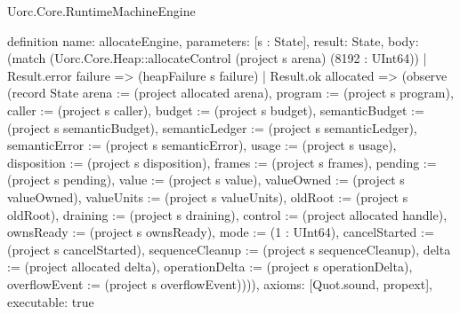 \begin{lexlean}{Uorc.Core.RuntimeMachineEngine}
\begin{semanticmodule}
definition{
  name: allocateEngine,
  parameters: [s : State],
  result: State,
  body: (match (Uorc.Core.Heap::allocateControl (project s arena) (8192 : UInt64))
    | Result.error failure => (heapFailure s failure)
    | Result.ok allocated => (observe (record State {arena := (project allocated arena), program := (project s program), caller := (project s caller), budget := (project s budget), semanticBudget := (project s semanticBudget), semanticLedger := (project s semanticLedger), semanticError := (project s semanticError), usage := (project s usage), disposition := (project s disposition), frames := (project s frames), pending := (project s pending), value := (project s value), valueOwned := (project s valueOwned), valueUnits := (project s valueUnits), oldRoot := (project s oldRoot), draining := (project s draining), control := (project allocated handle), ownsReady := (project s ownsReady), mode := (1 : UInt64), cancelStarted := (project s cancelStarted), sequenceCleanup := (project s sequenceCleanup), delta := (project allocated delta), operationDelta := (project s operationDelta), overflowEvent := (project s overflowEvent)}))),
  axioms: [Quot.sound, propext],
  executable: true
}


\end{semanticmodule}
\end{lexlean}
